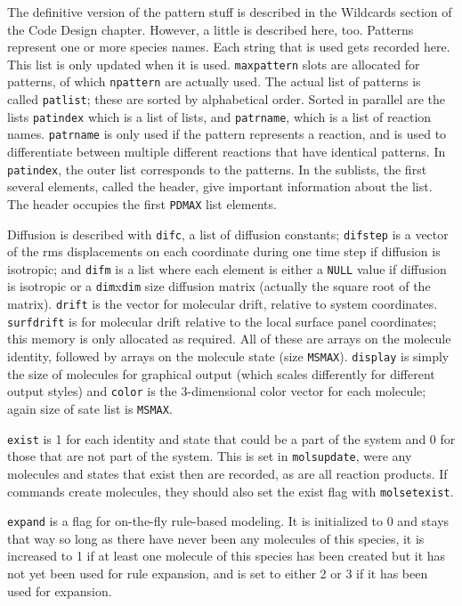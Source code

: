 \documentclass {scrbook}
\newcommand {\ttt} {\texttt}
\begin{document}
The definitive version of the pattern stuff is described in the Wildcards section of the Code Design chapter. However, a little is described here, too. Patterns represent one or more species names. Each string that is used gets recorded here. This list is only updated when it is used. \ttt{maxpattern} slots are allocated for patterns, of which \ttt{npattern} are actually used. The actual list of patterns is called \ttt{patlist}; these are sorted by alphabetical order. Sorted in parallel are the lists \ttt{patindex} which is a list of lists, and \ttt{patrname}, which is a list of reaction names. \ttt{patrname} is only used if the pattern represents a reaction, and is used to differentiate between multiple different reactions that have identical patterns. In \ttt{patindex}, the outer list corresponds to the patterns. In the sublists, the first several elements, called the header, give important information about the list. The header occupies the first \ttt{PDMAX} list elements.

Diffusion is described with \ttt{difc}, a list of diffusion constants; \ttt{difstep} is a vector of the rms displacements on each coordinate during one time step if diffusion is isotropic; and \ttt{difm} is a list where each element is either a \ttt{NULL} value if diffusion is isotropic or a \ttt{dim}x\ttt{dim} size diffusion matrix (actually the square root of the matrix). \ttt{drift} is the vector for molecular drift, relative to system coordinates. \ttt{surfdrift} is for molecular drift relative to the local surface panel coordinates; this memory is only allocated as required. All of these are arrays on the molecule identity, followed by arrays on the molecule state (size \ttt{MSMAX}). \ttt{display} is simply the size of molecules for graphical output (which scales differently for different output styles) and \ttt{color} is the 3-dimensional color vector for each molecule; again size of sate list is \ttt{MSMAX}.

\ttt{exist} is 1 for each identity and state that could be a part of the system and 0 for those that are not part of the system. This is set in \ttt{molsupdate}, were any molecules and states that exist then are recorded, as are all reaction products. If commands create molecules, they should also set the exist flag with \ttt{molsetexist}.

\ttt{expand} is a flag for on-the-fly rule-based modeling. It is initialized to 0 and stays that way so long as there have never been any molecules of this species, it is increased to 1 if at least one molecule of this species has been created but it has not yet been used for rule expansion, and is set to either 2 or 3 if it has been used for expansion.
\end{document}
